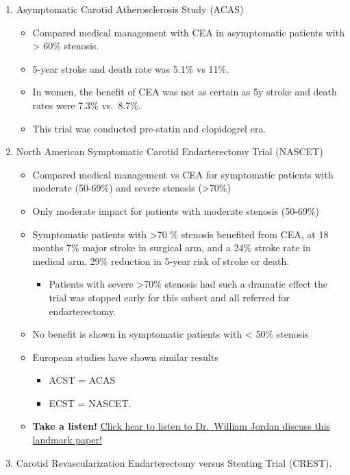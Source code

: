 \documentclass[
]{book}
\providecommand{\tightlist}{%
  \setlength{\itemsep}{0pt}\setlength{\parskip}{0pt}}
\begin{document}
\begin{enumerate}
\def\labelenumi{\arabic{enumi}.}
\item
  Asymptomatic Carotid Atherosclerosis Study (ACAS)

  \begin{itemize}
  \item
    Compared medical management with CEA in asymptomatic patients
    with \textgreater{} 60\% stenosis.
  \item
    5-year stroke and death rate was 5.1\% vs 11\%.
  \item
    In women, the benefit of CEA was not as certain as 5y stroke and
    death rates were 7.3\% vs.~8.7\%.
  \item
    This trial was conducted pre-statin and clopidogrel era.
  \end{itemize}
\item
  North American Symptomatic Carotid Endarterectomy Trial (NASCET)
  \citep{northamericansymptomaticcarotidendarterectomytrialcollaboratorsBeneficialEffectCarotid1991}

  \begin{itemize}
  \item
    Compared medical management vs CEA for symptomatic patients with
    moderate (50-69\%) and severe stenosis (\textgreater70\%)
  \item
    Only moderate impact for patients with moderate stenosis
    (50-69\%)
  \item
    Symptomatic patients with \textgreater70 \% stenosis benefited from CEA, at
    18 months 7\% major stroke in surgical arm, and a 24\% stroke rate
    in medical arm. 29\% reduction in 5-year risk of stroke or death.

    \begin{itemize}
    \tightlist
    \item
      Patients with severe \textgreater70\% stenosis had such a dramatic
      effect the trial was stopped early for this subset and all
      referred for endarterectomy.
    \end{itemize}
  \item
    No benefit is shown in symptomatic patients with \textless{} 50\% stenosis
  \item
    European studies have shown similar results

    \begin{itemize}
    \item
      ACST = ACAS
    \item
      ECST = NASCET.
    \end{itemize}
  \item
    \textbf{Take a listen!} \href{https://www.audiblebleeding.com/2021/09/29/landmark-papers-nascet/}{Click hear to listen to Dr.~William Jordan
    discuss this landmark
    paper!}
  \end{itemize}
\item
  Carotid Revascularization Endarterectomy versus Stenting Trial
  (CREST).\citep{silver2011}


\end{enumerate}
\end{document}
